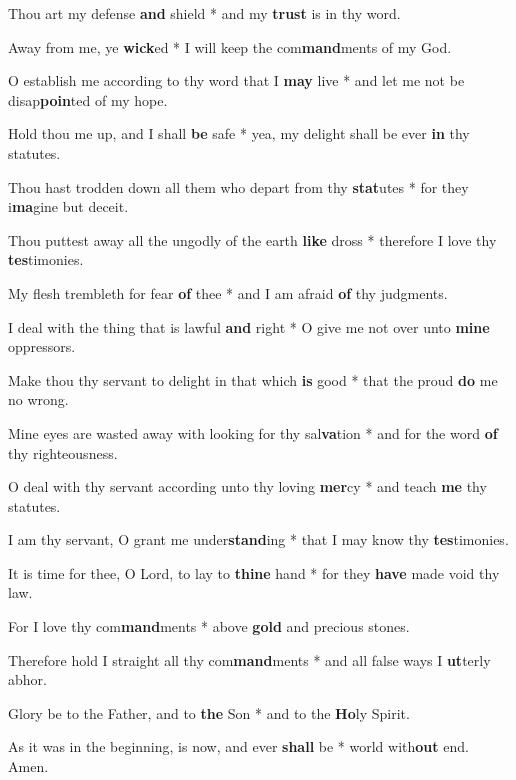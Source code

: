 \begin{multicols}{2}
	Thou art my defense \textbf{and} shield * and my \textbf{trust} is in thy word.
	
	Away from me, ye \textbf{wick}ed * I will keep the com\textbf{mand}ments of my God.
	
	O establish me according to thy word that I \textbf{may} live * and let me not be disap\textbf{poin}ted of my hope.
	
	Hold thou me up, and I shall \textbf{be} safe * yea, my delight shall be ever \textbf{in} thy statutes.
	
	Thou hast trodden down all them who depart from thy \textbf{stat}utes * for they i\textbf{ma}gine but deceit.
	
	Thou puttest away all the ungodly of the earth \textbf{like} dross * therefore I love thy \textbf{tes}timonies.
	
	My flesh trembleth for fear \textbf{of} thee * and I am afraid \textbf{of} thy judgments.
	
	I deal with the thing that is lawful \textbf{and} right * O give me not over unto \textbf{mine} oppressors.
	
	Make thou thy servant to delight in that which \textbf{is} good * that the proud \textbf{do} me no wrong.
	
	Mine eyes are wasted away with looking for thy sal\textbf{va}tion * and for the word \textbf{of} thy righteousness.
	
	O deal with thy servant according unto thy loving \textbf{mer}cy * and teach \textbf{me} thy statutes.
	
	I am thy servant, O grant me under\textbf{stand}ing * that I may know thy \textbf{tes}timonies.
	
	It is time for thee, O Lord, to lay to \textbf{thine} hand * for they \textbf{have} made void thy law.
	
	For I love thy com\textbf{mand}ments * above \textbf{gold} and precious stones.
	
	Therefore hold I straight all thy com\textbf{mand}ments * and all false ways I \textbf{ut}terly abhor. 
	
	Glory be to the Father, and to \textbf{the} Son * and to the \textbf{Ho}ly Spirit.
	
	As it was in the beginning, is now, and ever \textbf{shall} be * world with\textbf{out} end. Amen.
\end{multicols}